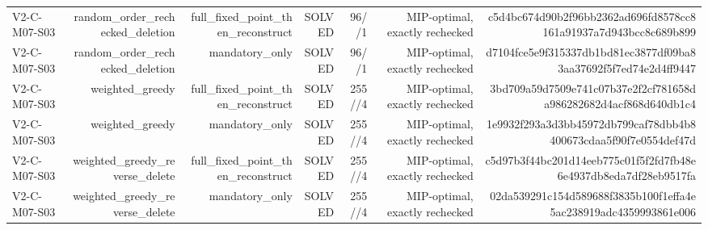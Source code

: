 {\begin{longtable}{lrrrrrr}
V2-C-M07-S03 & random\_order\_rechecked\_deletion & full\_fixed\_point\_then\_reconstruct & SOLVED & 96//1 & MIP-optimal, exactly rechecked & c5d4bc674d90b2f96bb2362ad696fd8578cc8161a91937a7d943bcc8c689b899 \\
V2-C-M07-S03 & random\_order\_rechecked\_deletion & mandatory\_only & SOLVED & 96//1 & MIP-optimal, exactly rechecked & d7104fce5e9f315337db1bd81ec3877df09ba83aa37692f5f7ed74e2d4ff9447 \\
V2-C-M07-S03 & weighted\_greedy & full\_fixed\_point\_then\_reconstruct & SOLVED & 255//4 & MIP-optimal, exactly rechecked & 3bd709a59d7509e741c07b37e2f2cf781658da986282682d4acf868d640db1c4 \\
V2-C-M07-S03 & weighted\_greedy & mandatory\_only & SOLVED & 255//4 & MIP-optimal, exactly rechecked & 1e9932f293a3d3bb45972db799caf78dbb4b8400673cdaa5f90f7e0554def47d \\
V2-C-M07-S03 & weighted\_greedy\_reverse\_delete & full\_fixed\_point\_then\_reconstruct & SOLVED & 255//4 & MIP-optimal, exactly rechecked & c5d97b3f44bc201d14eeb775c01f5f2fd7fb48e6e4937db8eda7df28eb9517fa \\
V2-C-M07-S03 & weighted\_greedy\_reverse\_delete & mandatory\_only & SOLVED & 255//4 & MIP-optimal, exactly rechecked & 02da539291c154d589688f3835b100f1effa4e5ac238919adc4359993861e006 \\
\bottomrule
\end{longtable}
}
